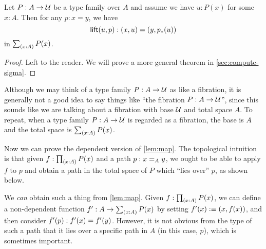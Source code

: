 \begin{lem}\label{thm:path-lifting}
  Let $P:A\to\type$ be a type family over $A$ and assume we have $u:P(x)$ for some $x:A$.
  Then for any $p:x=y$, we have
  \begin{equation*}
    \mathsf{lift}(u,p):(x,u)=(y,\trans{p}{u})
  \end{equation*}
  in $\sm{x:A}P(x)$.
\end{lem}
\begin{proof}
  Left to the reader.
  We will prove a more general theorem in \autoref{sec:compute-sigma}.
\end{proof}

\begin{rmk}
  Although we may think of a type family $P:A\to \type$ as like a fibration, it is generally not a good idea to say things like ``the fibration $P:A\to\type$'', since this sounds like we are talking about a fibration with base $\type$ and total space $A$.
  To repeat, when a type family $P:A\to \type$ is regarded as a fibration, the base is $A$ and the total space is $\sm{x:A} P(x)$.
\end{rmk}

Now we can prove the dependent version of \autoref{lem:map}.
The topological intuition is that given $f:\prd{x:A} P(x)$ and a path $p:\id[A]xy$, we ought to be able to apply $f$ to $p$ and obtain a path in the total space of $P$ which ``lies over'' $p$, as shown below.

\begin{center}
\end{center}

We \emph{can} obtain such a thing from \autoref{lem:map}.
Given $f:\prd{x:A} P(x)$, we can define a non-dependent function $f':A\to \sm{x:A} P(x)$ by setting $f'(x)\defeq (x,f(x))$, and then consider $\ap{f'}{p} : f'(x) = f'(y)$.
However, it is not obvious from the type of such a path that it lies over a specific path in $A$ (in this case, $p$), which is sometimes important.

